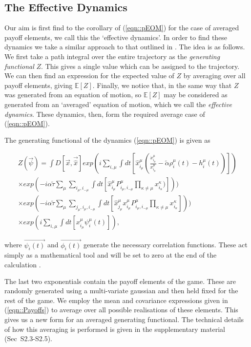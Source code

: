 \documentclass{article}
\newcommand{\xnotmu}[2]{x_{#1_#2}^{#2}}
\newcommand{\payoff}[2]{P^{#2}_{#1_#2, #1_{-#2}}}
\newcommand{\dnotxmu}[1]{\dot{x}_{#1_\mu}^{\mu}}
\newcommand{\hnotxmu}[1]{\hat{x}_{#1_\mu}^{\mu}}
\newcommand{\talpha}{\tilde{\alpha}}
\newcommand{\ttau}{\tilde{\tau}}
\begin{document}
\subsection{The Effective Dynamics}
\label{sec::eff_dyn}


Our aim is first find to the corollary of (\ref{eqn::pEOM}) for the case of averaged payoff elements, we call this the `effective dynamics'. In order to find these dynamics we take a similar approach to that outlined in \cite{mezard:spinglass}. The idea is as follows. We first take a path integral over the entire trajectory as the \textit{generating functional} $Z$. This gives a single value which can be assigned to the trajectory. We can then find an expression for the expected value of $Z$ by averaging over all payoff elements, giving $\mathbb{E}[Z]$. Finally, we notice that, in the same way that $Z$ was generated from an equation of motion, so $\mathbb{E}[Z]$ may be considered as generated from an `averaged' equation of motion, which we call the \textit{effective dynamics}. These dynamics, then, form the required average case of (\ref{eqn::pEOM}).

The generating functional of the dynamics (\ref{eqn::pEOM}) is given as

{\small
\begin{equation}
\label{eqn::separatePayoffs}
  \begin{split}
  Z(\Vec{\psi}) = \int D[\Vec{x}, \Vec{\hat{x}}] exp( i \sum_{i, \mu} \int dt [ \hnotxmu{i} (\frac{\dnotxmu{i}}{\xnotmu{i}{\mu}} - \talpha \rho_i^\mu (t) - h_i^\mu (t))]) \\ \times  exp(-i \alpha \ttau \sum_{\mu} \sum_{i_\mu, i_{-\mu}} \int dt [\hnotxmu{i} \payoff{i}{\mu} \prod_{\kappa \neq \mu} \xnotmu{i}{\kappa} )])) 
    \\ \times  exp(-i \alpha \ttau \sum_{\mu} \sum_{j_\mu, i_\mu, i_{-\mu}} \int dt [\hnotxmu{j}  \xnotmu{i}{\mu} \payoff{i}{\mu} \prod_{\kappa \neq \mu} \xnotmu{i}{\kappa}])) 
  \\ \times exp(i \sum_{i, \mu}
  \int dt[\xnotmu{i}{\mu} \psi^\mu_i(t)]),
\end{split}
\end{equation}
}

where $\Vec{\psi_i(t)}$ and
$\Vec{\phi_i(t)}$ generate the necessary correlation functions. These act simply as a mathematical tool and will be set to zero at the end of the calculation \cite{coolen:minority}. 

The last two exponentials contain the payoff elements of the game. These are randomly generated using a multi-variate gaussian and then held fixed for the rest of the game. We employ the mean and covariance expressions given in (\ref{eqn::Payoffs}) to average over all possible realisations of these elements. This gives us a new form for an averaged generating functional. The technical details of how this averaging is performed is given in the supplementary material (Sec~S2.3-S2.5). 
\end{document}
